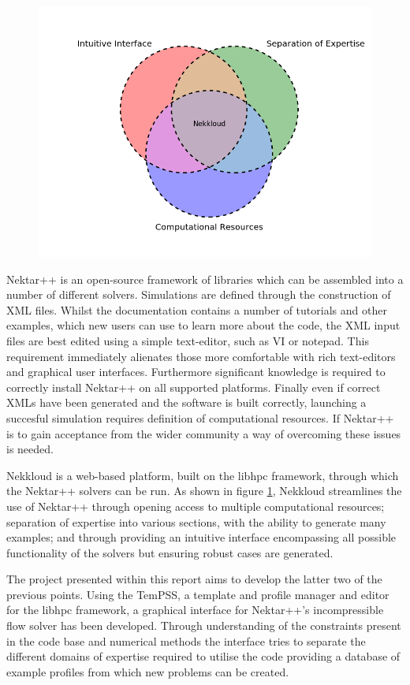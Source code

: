 \documentclass[11pt, a4paper]{report}
\begin{document}
\begin{figure}[htb!]
 \centering
 \includegraphics[width=.75\linewidth,  clip=true, trim = .4cm .4cm .4cm .4cm]{venn_diagram}
 \label{fig:venn_diagram}
\end{figure}

Nektar++\cite{Nektar2015} is an open-source framework of libraries which can be assembled into a number of different solvers. Simulations are defined through the construction of XML\cite{Solo_etal2002} files. Whilst the documentation contains a number of tutorials and other examples, which new users can use to learn more about the code, the XML input files are best edited using a simple text-editor, such as VI or notepad. This requirement immediately alienates those more comfortable with rich text-editors and graphical user interfaces. Furthermore significant knowledge is required to correctly install Nektar++ on all supported platforms. Finally even if correct XMLs have been generated and the software is built correctly, launching a succesful simulation requires definition of computational resources. If Nektar++ is to gain acceptance from the wider community a way of overcoming these issues is needed.

Nekkloud\cite{Cohen_etal2013} is a web-based platform, built on the libhpc framework, through which the Nektar++ solvers can be run. As shown in figure \ref{fig:venn_diagram}, Nekkloud streamlines the use of Nektar++ through opening access to multiple computational resources; separation of expertise into various sections, with the ability to generate many examples; and through providing an intuitive interface encompassing all possible functionality of the solvers but ensuring robust cases are generated.

The project presented within this report aims to develop the latter two of the previous points. Using the TemPSS\cite{Austing_etal2017}, a template and profile manager and editor for the libhpc framework, a graphical interface for Nektar++'s incompressible flow solver has been developed. Through understanding of the constraints present in the code base and numerical methods the interface tries to separate the different domains of expertise required to utilise the code providing a database of example profiles from which new problems can be created.
\newpage
\end{document}
